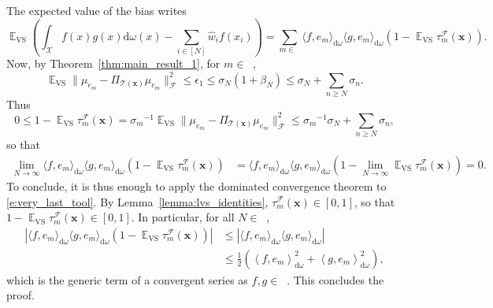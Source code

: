 \documentclass[twoside,11pt]{book}
\DeclareMathOperator{\VS}{\mathrm{VS}}
\DeclareMathOperator{\EX}{\mathbb{E}}
\DeclareMathOperator{\F}{\mathcal{F}}
\DeclareMathOperator{\X}{\mathcal{X}}
\DeclareMathOperator{\Ltwo}{\mathbb{L}_{2}(\mathrm{d} \omega)}
\DeclareMathOperator{\Ns}{\mathbb{N}^{*}}
\begin{document}
The expected value of the bias writes
\begin{equation}
\EX_{\VS} \left( \int_{\X} f(x)g(x) \mathrm{d}\omega(x) - \sum\limits_{i \in [N]} \widehat{w}_{i}f(x_{i}) \right)= \sum\limits_{m \in \Ns} \langle f,e_{m} \rangle_{\mathrm{d}\omega}\langle g,e_{m} \rangle_{\mathrm{d}\omega} \left( 1- \EX_{\VS}\tau_{m}^{\F}(\bm{x}) \right).
\label{e:very_last_tool}
\end{equation}
Now, by Theorem~\ref{thm:main_result_1}, for $m \in \Ns$,
\begin{equation}
\EX_{\VS} \|\mu_{e_{m}} - \Pi_{\mathcal{T}(\bm{x})} \mu_{e_{m}}\|_{\F}^{2} \leq \epsilon_{1} \leq \sigma_{N}(1+\beta_{N}) \leq \sigma_{N} + \sum\limits_{n \geq N} \sigma_{n}.
\end{equation}
Thus
\begin{equation}
0 \leq 1-\EX_{\VS} \tau_{m}^{\F}(\bm{x}) = {\sigma_m}^{-1} \EX_{\VS} \|\mu_{e_{m}} - \Pi_{\mathcal{T}(\bm{x})} \mu_{e_{m}}\|_{\F}^{2} \leq {\sigma_{m}}^{-1}{\sigma_{N} + \sum\limits_{n \geq N} \sigma_{n}},
\end{equation}
so that
\begin{align}
\lim_{N \rightarrow \infty} \langle f,e_{m} \rangle_{\mathrm{d}\omega}\langle g,e_{m} \rangle_{\mathrm{d}\omega} \left(1- \EX_{\VS}\tau_{m}^{\F}(\bm{x}) \right) & = \langle f,e_{m} \rangle_{\mathrm{d}\omega}\langle g,e_{m} \rangle_{\mathrm{d}\omega} (1-\lim_{N \rightarrow \infty} \EX_{\VS}\tau_{m}^{\F}(\bm{x})) = 0.
\end{align}
To conclude, it is thus enough to apply the dominated convergence theorem to \eqref{e:very_last_tool}. By Lemma~\ref{lemma:lvs_identities}, $\tau_{m}^{\F}(\bm{x}) \in [0,1]$, so that $1-\EX_{\VS}\tau_{m}^{\F}(\bm{x}) \in [0,1]$.
In particular, for all $N \in \Ns$,
\begin{align}
|\langle f,e_{m} \rangle_{\mathrm{d}\omega}\langle g,e_{m} \rangle_{\mathrm{d}\omega} \left(1- \EX_{\VS}\tau_{m}^{\F}(\bm{x}) \right)| & \leq |\langle f,e_{m} \rangle_{\mathrm{d}\omega}\langle g,e_{m} \rangle_{\mathrm{d}\omega}|\\
& \leq \frac{1}{2}\left(\left\langle f,e_{m} \right\rangle_{\mathrm{d}\omega}^{2} + \left\langle g,e_{m} \right\rangle_{\mathrm{d}\omega}^{2}\right),
\end{align}
which is the generic term of a convergent series as $f,g\in\Ltwo$. This concludes the proof.
\end{document}

